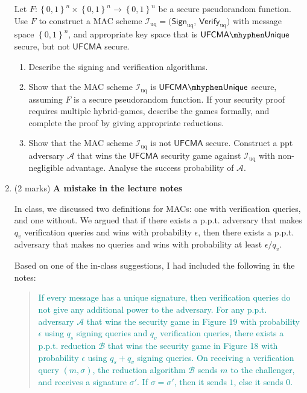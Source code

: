 \documentclass[11pt]{article}
\newcommand{\UFCMA}{\mathsf{UFCMA}}
\newcommand{\sign}{\mathsf{Sign}}
\newcommand{\verify}{\mathsf{Verify}}
\newcommand{\UFCMAU}{\UFCMA \mhyphen \mathsf{Unique}}
\newcommand{\uniq}{\mathrm{uq}}
\newcommand{\bit}{\left\{0, 1\right\}}
\newcommand{\calA}{\mathcal{A}}
\newcommand{\calB}{\mathcal{B}}
\newcommand{\calI}{\mathcal{I}}
\begin{document}
\begin{enumerate}
        Let $F: \bit^n \times \bit^n \to \bit^n$ be a secure pseudorandom function. Use $F$ to construct a MAC scheme $\calI_{\uniq}  = (\sign_{\uniq}$, $\verify_{\uniq})$ with message space $\bit^n$, and appropriate key space  that is $\UFCMAU$ secure, but not $\UFCMA$ secure. 

        \begin{enumerate}
            \item Describe the signing and verification algorithms.  
            
            \item Show that the MAC scheme $\calI_{\uniq}$ is $\UFCMAU$ secure, assuming $F$ is a secure pseudorandom function. If your security proof requires multiple hybrid-games, describe the games formally, and complete the proof by giving appropriate reductions.

            \item Show that the MAC scheme $\calI_{\uniq}$ is not $\UFCMA$ secure. Construct a ppt adversary $\calA$ that wins the $\UFCMA$ security game against $\calI_{\uniq}$ with non-negligible advantage. Analyse the success probability of $\calA$. 
        \end{enumerate}



        \newpage 
        \item (2 marks) \textbf{A mistake in the lecture notes}

        In class, we discussed two definitions for MACs: one with verification queries, and one without. We argued that if there exists a p.p.t. adversary that makes $q_v$ verification queries and wins with probability $\epsilon$, then there exists a p.p.t. adversary that makes no queries and wins with probability at least $\epsilon/q_v$. 

        Based on one of the in-class suggestions, I had included the following in the notes: 
        \begin{quote}
            \textcolor{darkcyan}{If every message has a unique signature, then verification queries do not give any additional power to the adversary. For any p.p.t. adversary $\calA$ that wins the security game in Figure 19 with probability $\epsilon$ using $q_s$ signing queries and $q_v$ verification queries, there exists a p.p.t. reduction $\calB$ that wins the security game in Figure 18 with probability $\epsilon$ using $q_s + q_v$ signing queries. On receiving a verification query $(m, \sigma)$, the reduction algorithm $\calB$ sends $m$ to the challenger, and receives a signature $\sigma'$. If $\sigma = \sigma'$, then it sends $1$, else it sends $0$.}
        \end{quote} 


\end{enumerate}
\end{document}
